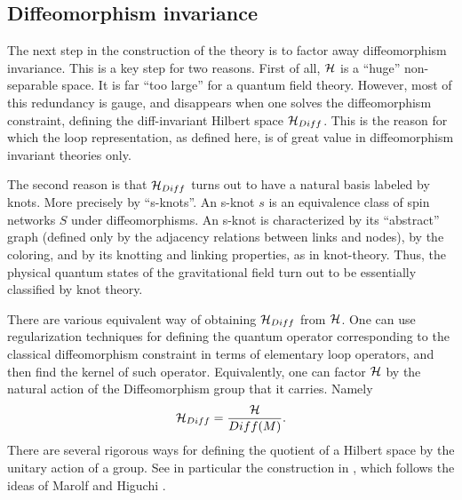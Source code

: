 \subsection{Diffeomorphism invariance}\label{diffinvariance}

The next step in the construction of the theory is to factor 
away diffeomorphism invariance.  This is a key step for two 
reasons.  First of all, $\cal H$ is a ``huge'' non-separable 
space.  It is far ``too large'' for a quantum field theory.  
However, most of this redundancy is gauge, and disappears 
when one solves the diffeomorphism constraint, defining the 
diff-invariant Hilbert space ${\cal H}_{Diff}$.  This is the reason 
for which the loop representation, as defined here, is of 
great value in diffeomorphism invariant theories only.

The second reason is that ${\cal H}_{Diff}$ turns out to have a 
natural basis labeled by knots.  More precisely by 
``s-knots''.  An s-knot $s$ is an equivalence class of spin 
networks $S$ under diffeomorphisms.  An s-knot is 
characterized by its ``abstract'' graph (defined only by the 
adjacency relations between links and nodes), by the 
coloring, and by its knotting and linking properties, as in 
knot-theory. Thus, the physical quantum states of the 
gravitational field turn out to be essentially classified by 
knot theory.

There are various equivalent way of obtaining ${\cal H}_{Diff}$ 
from ${\cal H}$.  One can use regularization techniques for 
defining the quantum operator corresponding to the classical 
diffeomorphism constraint in terms of elementary loop 
operators, and then find the kernel of such operator.  
Equivalently, one can factor ${\cal H}$ by the natural action 
of the Diffeomorphism group that it carries.  Namely 
\begin{equation} 
{\cal H}_{Diff}={{\cal H}\over Diff(M)}.  
\end{equation} 
There are several rigorous ways for defining the quotient of a 
Hilbert space by the unitary action of a group.  See in 
particular the construction in \cite{AshtekarEtAl95}, which 
follows the ideas of Marolf and Higuchi 
\cite{MarolfGroup,MarolfGroup2,MarolfGroup3,Higuchi}.

